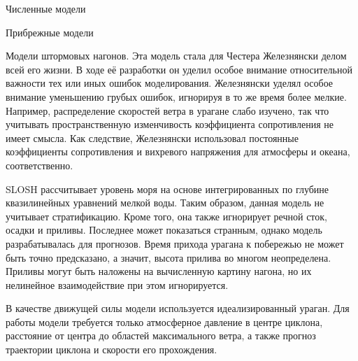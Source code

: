 \begin{chapter}{Численные модели}
\begin{section}{Прибрежные модели}
\begin{paragraph}{Модели штормовых нагонов.}
Эта модель стала для Честера Железнянски делом всей его жизни. 
В ходе её разработки он уделил особое внимание относительной важности 
тех или иных ошибок моделирования. Железнянски уделял особое внимание
уменьшению грубых ошибок, игнорируя в то же время более мелкие.
Например, распределение скоростей ветра в урагане слабо изучено,
так что учитывать пространственную изменчивость коэффициента сопротивления%
 не имеет смысла. Как следствие,
Железнянски использовал постоянные коэффициенты сопротивления и вихревого
напряжения для атмосферы и океана, соответственно.
%

SLOSH рассчитывает уровень моря на основе интегрированных по глубине
квазилинейных уравнений мелкой воды. Таким образом, данная модель не
учитывает стратификацию. Кроме того, она также игнорирует речной сток, осадки
и приливы. Последнее может показаться странным, однако модель
разрабатывалась для прогнозов. Время прихода урагана к побережью не может
быть точно предсказано, а значит, высота прилива во многом неопределена. 
Приливы могут быть наложены на вычисленную
картину нагона, но их нелинейное взаимодействие при этом игнорируется.
%

В качестве движущей силы модели используется идеализированный ураган.
Для работы модели требуется только атмосферное давление в центре циклона,
расстояние от центра до областей максимального ветра, а также прогноз
траектории циклона и скорости его прохождения.  
%


\end{paragraph}
\end{section}
\end{chapter}
